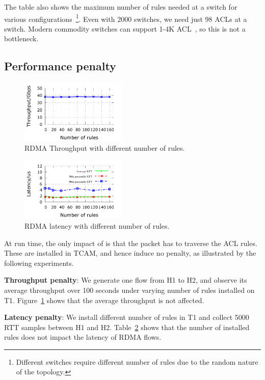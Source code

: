 The table also shows the maximum number of rules needed at a switch for various
configurations~\footnote{Different switches require different number of rules
due to the random nature of the topology.}. Even with 2000 switches, we need
just 98 ACLs at a switch. Modern commodity switches can support 1-4K
ACL~\cite{xx}, so this is not a bottleneck. 

\subsection{Performance penalty}\label{subsec:exp_performanceoverhead}

\begin{figure}
	\centering
	\includegraphics[width=0.45\textwidth] {figs/overhead_avgthrpt}
	\caption{RDMA Throughput with different number of rules.}\label{fig:thrpt_overhead}
\end{figure}

\begin{figure}
	\centering
	\includegraphics[width=0.45\textwidth] {figs/RDMAlatency_overhead}
	\caption{RDMA latency with different number of rules.}\label{fig:latency_overhead}
\end{figure}

At run time, the only impact of \sysname{} is that the packet has
to traverse the ACL rules. These are installed in TCAM, and hence induce
no penalty, as illustrated by the following experiments.

\textbf{Throughput penalty}: We generate one flow from H1 to H2, and observe
its average throughput over 100 seconds under varying number of \sysname{} rules
installed on T1. Figure~\ref{fig:thrpt_overhead} shows that the average
throughput is not affected.

\textbf{Latency penalty}: We install different number of \sysname{} rules in T1
and collect 5000 RTT samples between H1 and H2.
Table~\ref{fig:latency_overhead} shows that the number of installed rules does
not impact the latency of RDMA flows.

